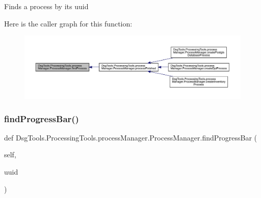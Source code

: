 \begin{DoxyVerb}Finds a process by its uuid
\end{DoxyVerb}
 Here is the caller graph for this function\+:
\nopagebreak
\begin{figure}[H]
\begin{center}
\leavevmode
\includegraphics[width=350pt]{class_dsg_tools_1_1_processing_tools_1_1process_manager_1_1_process_manager_a3cb0f2196fab53adc17312b1eadd2386_icgraph}
\end{center}
\end{figure}
\mbox{\label{class_dsg_tools_1_1_processing_tools_1_1process_manager_1_1_process_manager_ab6a56eaab22e457bcb0eb8a9f70e3e05}} 
\subsubsection{\texorpdfstring{find\+Progress\+Bar()}{findProgressBar()}}
{\footnotesize\ttfamily def Dsg\+Tools.\+Processing\+Tools.\+process\+Manager.\+Process\+Manager.\+find\+Progress\+Bar (\begin{DoxyParamCaption}\item[{}]{self,  }\item[{}]{uuid }\end{DoxyParamCaption})}

